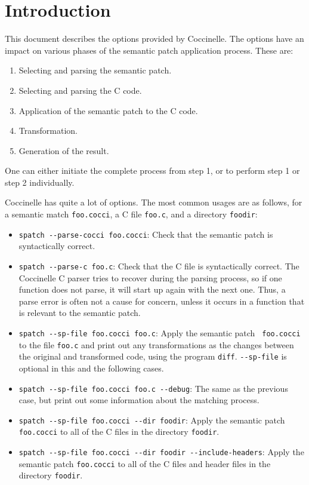 \section{Introduction}

This document describes the options provided by Coccinelle.  The options
have an impact on various phases of the semantic patch application
process.  These are:

\begin{enumerate}
\item Selecting and parsing the semantic patch.
\item Selecting and parsing the C code.
\item Application of the semantic patch to the C code.
\item Transformation.
\item Generation of the result.
\end{enumerate}

\noindent
One can either initiate the complete process from step 1, or
to perform step 1 or step 2 individually.

Coccinelle has quite a lot of options.  The most common usages are as
follows, for a semantic match {\tt foo.cocci}, a C file {\tt foo.c}, and a
directory {\tt foodir}:

\begin{itemize}
\item {\tt spatch -{}-parse-cocci foo.cocci}: Check that the semantic patch
  is syntactically correct.
\item {\tt spatch -{}-parse-c foo.c}: Check that the C file
  is syntactically correct.  The Coccinelle C parser tries to recover
  during the parsing process, so if one function does not parse, it will
  start up again with the next one.  Thus, a parse error is often not a
  cause for concern, unless it occurs in a function that is relevant to the
  semantic patch.
\item {\tt spatch -{}-sp-file foo.cocci foo.c}: Apply the semantic patch {\tt
    foo.cocci} to the file {\tt foo.c} and print out any transformations as
  the changes between the original and transformed code, using the program
  {\tt diff}.  {\tt -{}-sp-file} is optional in this and the following cases.
\item {\tt spatch -{}-sp-file foo.cocci foo.c -{}-debug}:  The same as the
  previous case, but print out some information about the matching process.
\item {\tt spatch -{}-sp-file foo.cocci -{}-dir foodir}:  Apply the semantic
  patch {\tt foo.cocci} to all of the C files in the directory {\tt foodir}.
\item {\tt spatch -{}-sp-file foo.cocci -{}-dir foodir -{}-include-headers}:  Apply
  the semantic patch {\tt foo.cocci} to all of the C files and header files
  in the directory {\tt foodir}.
\end{itemize}


